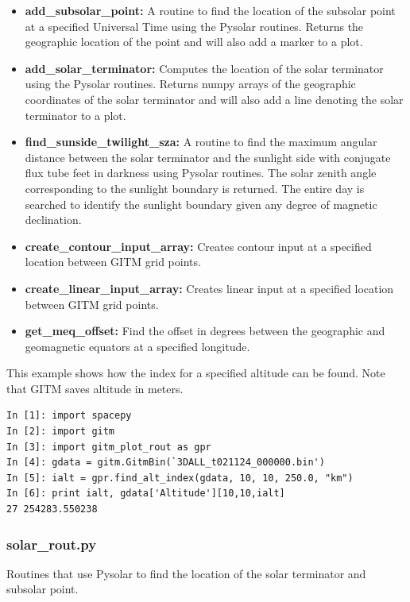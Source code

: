 \begin{itemize}
\item[]{{\bf add\_subsolar\_point: } A routine to find the location of the subsolar point at a specified Universal Time using the Pysolar routines.  Returns the geographic location of the point and will also add a marker to a plot.}
\item[]{{\bf add\_solar\_terminator: } Computes the location of the solar terminator using the Pysolar routines. Returns numpy arrays of the geographic coordinates of the solar terminator and will also add a line denoting the solar terminator to a plot.}
\item[]{{\bf find\_sunside\_twilight\_sza:} A routine to find the maximum angular distance between the solar terminator and the sunlight side with conjugate flux tube feet in darkness using Pysolar routines.  The solar zenith angle corresponding to the sunlight boundary is returned.  The entire day is searched to identify the sunlight boundary given any degree of magnetic declination.}
\item[]{{\bf create\_contour\_input\_array:}  Creates contour input at a specified location between GITM grid points.}
\item[]{{\bf create\_linear\_input\_array:}  Creates linear input at a specified location between GITM grid points.}
\item[]{{\bf get\_meq\_offset: } Find the offset in degrees between the geographic and geomagnetic equators at a specified longitude.}
\end{itemize}

This example shows how the index for a specified altitude can be found.  Note that GITM saves altitude in meters.

\begin{verbatim}
In [1]: import spacepy
In [2]: import gitm
In [3]: import gitm_plot_rout as gpr
In [4]: gdata = gitm.GitmBin(`3DALL_t021124_000000.bin')
In [5]: ialt = gpr.find_alt_index(gdata, 10, 10, 250.0, "km")
In [6]: print ialt, gdata['Altitude'][10,10,ialt]
27 254283.550238
\end{verbatim}

\subsubsection{solar\_rout.py}

Routines that use Pysolar to find the location of the solar terminator and subsolar point.

